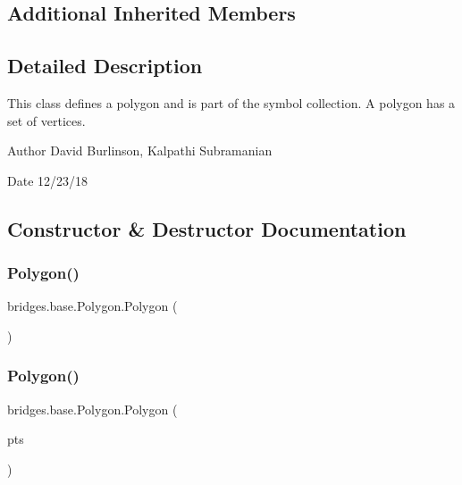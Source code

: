 \subsection*{Additional Inherited Members}


\subsection{Detailed Description}
This class defines a polygon and is part of the symbol collection. A polygon has a set of vertices. 

\begin{DoxyAuthor}{Author}
David Burlinson, Kalpathi Subramanian 
\end{DoxyAuthor}
\begin{DoxyDate}{Date}
12/23/18 
\end{DoxyDate}


\subsection{Constructor \& Destructor Documentation}
\mbox{\label{classbridges_1_1base_1_1_polygon_af0c1b3bc3147ffbda98fd9c515a8052d}} 
\subsubsection{\texorpdfstring{Polygon()}{Polygon()}\hspace{0.1cm}{\footnotesize\ttfamily [1/2]}}
{\footnotesize\ttfamily bridges.\+base.\+Polygon.\+Polygon (\begin{DoxyParamCaption}{ }\end{DoxyParamCaption})}

\mbox{\label{classbridges_1_1base_1_1_polygon_a341cc297ba7f0f201d31aa3c98ecf108}} 
\subsubsection{\texorpdfstring{Polygon()}{Polygon()}\hspace{0.1cm}{\footnotesize\ttfamily [2/2]}}
{\footnotesize\ttfamily bridges.\+base.\+Polygon.\+Polygon (\begin{DoxyParamCaption}\item[{Array\+List$<$ Float $>$}]{pts }\end{DoxyParamCaption})}



